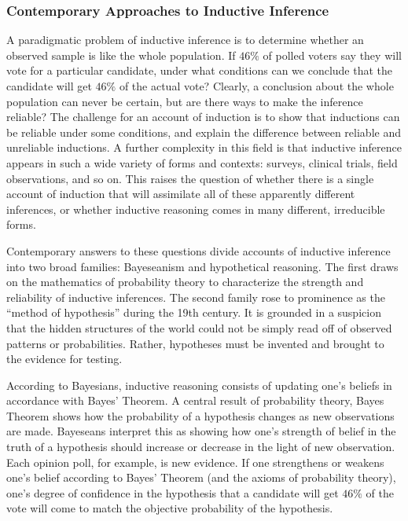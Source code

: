 \documentclass{article}[11pt]
\begin{document}

\subsubsection*{Contemporary Approaches to Inductive Inference}

A paradigmatic problem of inductive inference is to determine whether an observed sample is like the whole population.  If $46\%$ of polled voters say they will vote for a particular candidate, under what conditions can we conclude that the candidate will get $46\%$ of the actual vote?  Clearly, a conclusion about the whole population can never be certain, but are there ways to make the inference reliable? The challenge for an account of induction is to show that inductions can be reliable under some conditions, and explain the difference between reliable and unreliable inductions.  A further complexity in this field is that inductive inference appears in such a wide variety of forms and contexts: surveys, clinical trials, field observations, and so on.  This raises the question of whether there is a single account of induction that will assimilate all of these apparently different inferences, or whether inductive reasoning comes in many different, irreducible forms.


Contemporary answers to these questions divide accounts of inductive inference into two broad families:  Bayeseanism and hypothetical reasoning.  The first draws on the mathematics of probability theory to characterize the strength and reliability of inductive inferences.  The second family rose to prominence as the ``method of hypothesis'' during the 19th century.  It is grounded in a suspicion that the hidden structures of the world could not be simply read off of observed patterns or probabilities.  Rather, hypotheses must be invented and brought to the evidence for testing.

According to Bayesians, inductive reasoning consists of updating one's beliefs in accordance with Bayes' Theorem.  A central result of probability theory, Bayes Theorem shows how the probability of a hypothesis changes as new observations are made.  Bayeseans interpret this as showing how one's strength of belief in the truth of a hypothesis should increase or decrease in the light of new observation.  Each opinion poll, for example, is new evidence.  If one strengthens or weakens one's belief according to Bayes' Theorem (and the axioms of probability theory), one's degree of confidence in the hypothesis that a candidate will get $46\%$ of the vote will come to match the objective probability of the hypothesis.
\end{document}
